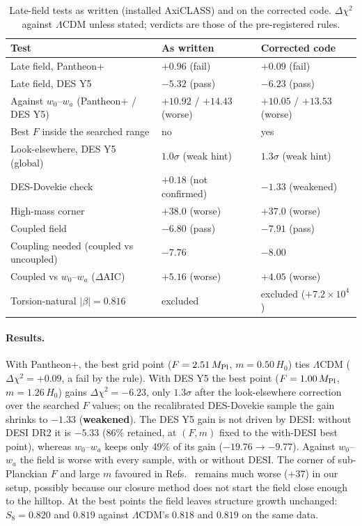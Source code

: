 \documentclass[11pt]{article}
\newcommand{\Mp}{M_{\rm Pl}}
\begin{document}
\begin{table}[h]\centering\small
\caption{Late-field tests as written (installed AxiCLASS) and on the corrected code. $\Delta\chi^2$ against
$\Lambda$CDM unless stated; verdicts are those of the pre-registered rules.}\label{tab:nr}
\begin{tabular}{lll}
\hline
Test & As written & Corrected code \\
\hline
Late field, Pantheon+ & $+0.96$ (fail) & $+0.09$ (fail) \\
Late field, DES Y5 & $-5.32$ (pass) & $-6.23$ (pass) \\
Against $w_0$--$w_a$ (Pantheon+ / DES Y5) & $+10.92$ / $+14.43$ (worse) & $+10.05$ / $+13.53$ (worse) \\
Best $F$ inside the searched range & no & yes \\
Look-elsewhere, DES Y5 (global) & $1.0\sigma$ (weak hint) & $1.3\sigma$ (weak hint) \\
DES-Dovekie check & $+0.18$ (not confirmed) & $-1.33$ (weakened) \\
High-mass corner & $+38.0$ (worse) & $+37.0$ (worse) \\
Coupled field & $-6.80$ (pass) & $-7.91$ (pass) \\
Coupling needed (coupled vs uncoupled) & $-7.76$ & $-8.00$ \\
Coupled vs $w_0$--$w_a$ ($\Delta$AIC) & $+5.16$ (worse) & $+4.05$ (worse) \\
Torsion-natural $|\beta|=0.816$ & excluded & excluded ($+7.2\times10^4$) \\
\hline
\end{tabular}\end{table}

\paragraph{Results.} With Pantheon+, the best grid point ($F=2.51\,\Mp$, $m=0.50\,H_0$) ties $\Lambda$CDM
($\Delta\chi^2=+0.09$, a fail by the rule). With DES Y5 the best point ($F=1.00\,\Mp$, $m=1.26\,H_0$) gains
$\Delta\chi^2=-6.23$, only $1.3\sigma$ after the look-elsewhere correction over the searched $F$ values; on the
recalibrated DES-Dovekie sample the gain shrinks to $-1.33$ (\textbf{weakened}). The DES Y5 gain is not driven by
DESI: without DESI DR2 it is $-5.33$ (86\% retained, at $(F,m)$ fixed to the with-DESI best point), whereas
$w_0$--$w_a$ keeps only 49\% of its gain ($-19.76\to-9.77$). Against $w_0$--$w_a$ the field is worse with every
sample, with or without DESI. The corner of sub-Planckian $F$ and large $m$ favoured in Refs.~\cite{lin2025,shiu2026}
remains much worse ($+37$) in our setup, possibly because our closure method does not start the field close enough to
the hilltop. At the best points the field leaves structure growth unchanged: $S_8=0.820$ and $0.819$ against
$\Lambda$CDM's $0.818$ and $0.819$ on the same data.
\end{document}
